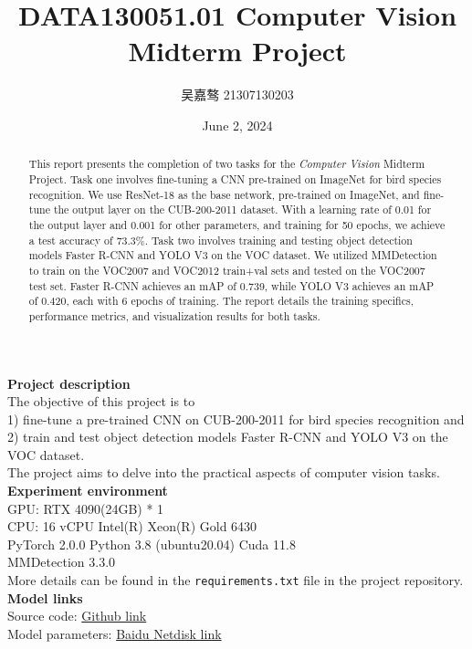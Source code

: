 \documentclass[UTF8]{ctexart}
\title{\textbf{DATA130051.01 Computer Vision Midterm Project}}
\author{吴嘉骜 21307130203}
\date{June 2, 2024}
\begin{document}
\maketitle

\begin{abstract}
    \normalsize
    \noindent
    This report presents the completion of two tasks for the \textit{Computer Vision} Midterm Project.
    Task one involves fine-tuning a CNN pre-trained on ImageNet for bird species recognition. 
    We use ResNet-18 as the base network, pre-trained on ImageNet, and fine-tune the output layer on the CUB-200-2011 dataset. With a learning rate of 0.01 for the output layer and 0.001 for other parameters, 
    and training for 50 epochs, we achieve a test accuracy of 73.3\%.
    Task two involves training and testing object detection models Faster R-CNN and YOLO V3 on the VOC dataset. 
    We utilized MMDetection to train on the VOC2007 and VOC2012 train+val sets and tested on the VOC2007 test set. 
    Faster R-CNN achieves an mAP of 0.739, while YOLO V3 achieves an mAP of 0.420, each with 6 epochs of training.
    The report details the training specifics, performance metrics, and visualization results for both tasks.
\end{abstract}

\noindent
\textbf {Project description}\\  The objective of this project is to\\
1) fine-tune a pre-trained CNN on CUB-200-2011 for bird species recognition and \\
2) train and test object detection models Faster R-CNN and YOLO V3 on the VOC dataset.\\
The project aims to delve into the practical aspects of computer vision tasks.\\
\noindent
\textbf {Experiment environment} \\
    GPU: RTX 4090(24GB) * 1\\
    CPU: 16 vCPU Intel(R) Xeon(R) Gold 6430\\
    PyTorch  2.0.0  Python  3.8 (ubuntu20.04)  Cuda  11.8\\
    MMDetection 3.3.0\\
    More details can be found in the \texttt{requirements.txt} file in the project repository.\\
\noindent
\textbf {Model links} \\
Source code: \href{https://github.com/Julius-Woo/DATA130051.01-Computer-Vision/tree/main/Midterm}{Github link}\\
Model parameters: \href{https://pan.baidu.com/s/1O-toY96MSuXnaVT4yOSMvQ?pwd=92wa}{Baidu Netdisk link}\\
\end{document}
